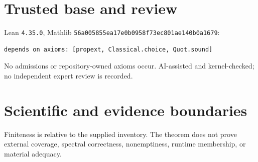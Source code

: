 \documentclass[11pt]{article}
\begin{document}
\section{Trusted base and review}
Lean \texttt{4.35.0}, Mathlib
\texttt{56a005855ea17e0b0958f73ec801ae140b0a1679}:
\begin{lstlisting}
depends on axioms: [propext, Classical.choice, Quot.sound]
\end{lstlisting}
No admissions or repository-owned axioms occur. AI-assisted and kernel-checked; no
independent expert review is recorded.
\section{Scientific and evidence boundaries}
Finiteness is relative to the supplied inventory. The theorem does not prove external
coverage, spectral correctness, nonemptiness, runtime membership, or material adequacy.
\end{document}
